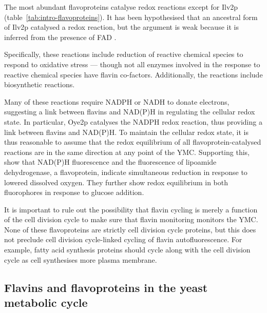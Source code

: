 The most abundant flavoproteins catalyse redox reactions except for Ilv2p (table~\ref{tab:intro-flavoproteins}).
It has been hypothesised that an ancestral form of Ilv2p catalysed a redox reaction, but the argument is weak because it is inferred from the presence of FAD \citep{pangCrystalStructureYeast2002}.

Specifically, these reactions include reduction of reactive chemical species to respond to oxidative stress --- though not all enzymes involved in the response to reactive chemical species have flavin co-factors.
Additionally, the reactions include biosynthetic reactions.

Many of these reactions require NADPH or NADH to donate electrons, suggesting a link between flavins and NAD(P)H in regulating the cellular redox state.
In particular, Oye2p catalyses the NADPH redox reaction, thus providing a link between flavins and NAD(P)H.
To maintain the cellular redox state, it is thus reasonable to assume that the redox equilibrium of all flavoprotein-catalysed reactions are in the same direction at any point of the YMC.
Supporting this, \citet{sianoNADHFlavinFluorescence1989} show that NAD(P)H fluorescence and the fluorescence of lipoamide dehydrogenase, a flavoprotein, indicate simultaneous reduction in response to lowered dissolved oxygen.
They further show redox equilibrium in both fluorophores in response to glucose addition.

It is important to rule out the possibility that flavin cycling is merely a function of the cell division cycle to make sure that flavin monitoring monitors the YMC.
None of these flavoproteins are strictly cell division cycle proteins, but this does not preclude cell division cycle-linked cycling of flavin autofluorescence.
For example, fatty acid synthesis proteins should cycle along with the cell division cycle as cell synthesises more plasma membrane.

\subsection{Flavins and flavoproteins in the yeast metabolic cycle}
\label{subsec:intro-flavin-ymc}

